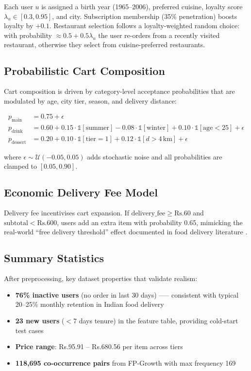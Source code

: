 \documentclass[conference]{IEEEtran}
\newcommand{\rupee}{Rs.}
\begin{document}
Each user $u$ is assigned a birth year (1965--2006), preferred cuisine,
loyalty score $\lambda_u \in [0.3, 0.95]$, and city. Subscription membership
(35\% penetration) boosts loyalty by $+0.1$. Restaurant selection follows
a loyalty-weighted random choice: with probability $\approx 0.5 + 0.5\lambda_u$
the user re-orders from a recently visited restaurant, otherwise they select
from cuisine-preferred restaurants.

\subsection{Probabilistic Cart Composition}

Cart composition is driven by category-level acceptance probabilities that are
modulated by age, city tier, season, and delivery distance:

\begin{align}
  p_\text{main}    &= 0.75 + \epsilon \\
  p_\text{drink}   &= 0.60 + 0.15 \cdot \mathbb{1}[\text{summer}]
                         - 0.08 \cdot \mathbb{1}[\text{winter}]
                         + 0.10 \cdot \mathbb{1}[\text{age} < 25]
                         + \epsilon \\
  p_\text{dessert} &= 0.20 + 0.10 \cdot \mathbb{1}[\text{tier}=1]
                         + 0.12 \cdot \mathbb{1}[d > 4\,\text{km}]
                         + \epsilon
\end{align}

where $\epsilon \sim \mathcal{U}(-0.05, 0.05)$ adds stochastic noise and all
probabilities are clamped to $[0.05, 0.90]$.

\subsection{Economic Delivery Fee Model}

Delivery fee incentivises cart expansion. If $\text{delivery\_fee} \geq
\text{\rupee}60$ and $\text{subtotal} < \text{\rupee}600$, users add an extra
item with probability 0.65, mimicking the real-world ``free delivery
threshold'' effect documented in food delivery literature
\cite{ailawadi2014, chintagunta2012}.

\subsection{Summary Statistics}

After preprocessing, key dataset properties that validate realism:
\begin{itemize}
  \item \textbf{76\% inactive users} (no order in last 30 days) -----
        consistent with typical 20--25\% monthly retention in Indian food
        delivery \cite{euromonitor2024}
  \item \textbf{23 new users} ($<$7 days tenure) in the feature table,
        providing cold-start test cases
  \item \textbf{Price range}: \rupee95.91 -- \rupee680.56 per item across tiers
  \item \textbf{118,695 co-occurrence pairs} from FP-Growth with max frequency 169
\end{itemize}
\end{document}
